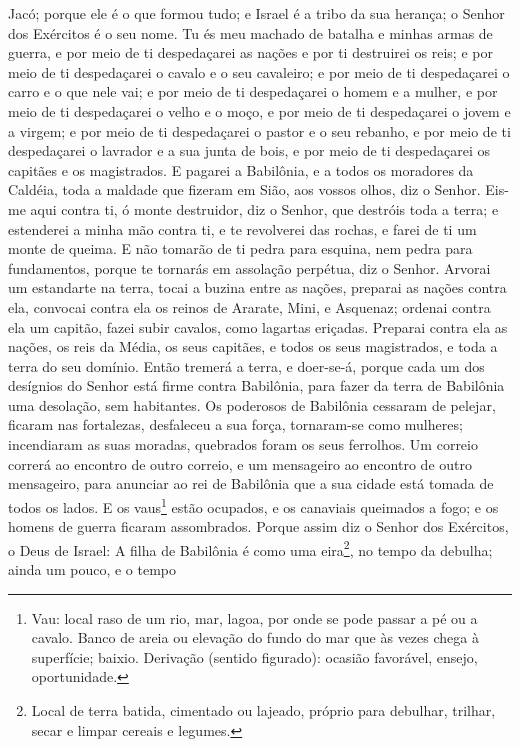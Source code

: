 Jacó; porque ele é o que formou tudo; e Israel é a tribo da sua
herança; o Senhor dos Exércitos é o seu nome. Tu és meu
machado de batalha e minhas armas de guerra, e por meio de ti
despedaçarei as nações e por ti destruirei os reis; e por
meio de ti despedaçarei o cavalo e o seu cavaleiro; e por meio de ti
despedaçarei o carro e o que nele vai; e por meio de ti
despedaçarei o homem e a mulher, e por meio de ti despedaçarei o
velho e o moço, e por meio de ti despedaçarei o jovem e a virgem;
e por meio de ti despedaçarei o pastor e o seu rebanho, e por
meio de ti despedaçarei o lavrador e a sua junta de bois, e por meio
de ti despedaçarei os capitães e os magistrados. E pagarei a
Babilônia, e a todos os moradores da Caldéia, toda a maldade que
fizeram em Sião, aos vossos olhos, diz o Senhor. Eis-me aqui
contra ti, ó monte destruidor, diz o Senhor, que destróis toda a
terra; e estenderei a minha mão contra ti, e te revolverei das
rochas, e farei de ti um monte de queima. E não tomarão de ti
pedra para esquina, nem pedra para fundamentos, porque te tornarás
em assolação perpétua, diz o Senhor. Arvorai um estandarte na
terra, tocai a buzina entre as nações, preparai as nações contra
ela, convocai contra ela os reinos de Ararate, Mini, e Asquenaz;
ordenai contra ela um capitão, fazei subir cavalos, como lagartas
eriçadas. Preparai contra ela as nações, os reis da Média, os
seus capitães, e todos os seus magistrados, e toda a terra do seu
domínio. Então tremerá a terra, e doer-se-á, porque cada um
dos desígnios do Senhor está firme contra Babilônia, para fazer da
terra de Babilônia uma desolação, sem habitantes. Os
poderosos de Babilônia cessaram de pelejar, ficaram nas fortalezas,
desfaleceu a sua força, tornaram-se como mulheres; incendiaram as
suas moradas, quebrados foram os seus ferrolhos. Um correio
correrá ao encontro de outro correio, e um mensageiro ao encontro de
outro mensageiro, para anunciar ao rei de Babilônia que a sua cidade
está tomada de todos os lados. E os vaus\footnote{Vau: local
raso de um rio, mar, lagoa, por onde se pode passar a pé ou a
cavalo. Banco de areia ou elevação do fundo do mar que às vezes
chega à superfície; baixio. Derivação (sentido figurado): ocasião
favorável, ensejo, oportunidade.} estão ocupados, e os canaviais
queimados a fogo; e os homens de guerra ficaram assombrados.
Porque assim diz o Senhor dos Exércitos, o Deus de Israel: A
filha de Babilônia é como uma eira\footnote{Local de terra batida,
cimentado ou lajeado, próprio para debulhar, trilhar, secar e limpar
cereais e legumes.}, no tempo da debulha; ainda um pouco, e o tempo
